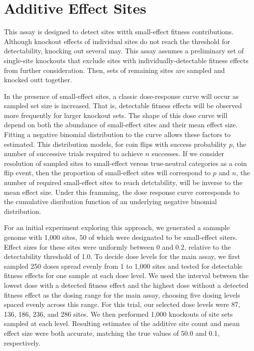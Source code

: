 \section{Additive Effect Sites}

This assay is designed to detect sites witth small-effect fitness contributions.
Although knockout effects of individual sites do not reach the threshold for detectability, knocking out several may.
This assay assumes a preliminary set of single-site knockouts that exclude sites with individually-detectable fitness effects from further consideration.
Then, sets of remaining sites are sampled and knocked outt together.

In the presence of small-effect sites, a classic dose-response curve will occur as sampled set size is increased.
That is, detectable fitness effects will be observed more frequently for larger knockout sets.
The shape of this dose curve will depend on both the abundance of small-effect sites and their mean effect size.
Fitting a negative binomial distribution to the curve allows these factors to estimated.
This distribution models, for coin flips with success probability $p$, the number of successive trials required to achieve $n$ successes.
If we consider resolution of sampled sites to small-effect versus true-neutral categories as a coin flip event, then the proportion of small-effect sites will correspond to $p$ and $n$, the number of required small-effect sites to reach detctability, will be inverse to the mean effect size.
Under this framming, the dose response curve corresponds to the cumulative disribution function of an underlying negative binomial distribution.

For an initial experiment exploring this approach, we generated a sammple genome with 1,000 sites, 50 of which were designated to be small-effect siters.
Effect sizes for these sites were uniformly between 0 and 0.2, relative to the detectability threshold of 1.0.
To decide dose levels for the main assay, we first sampled 250 doses spread evenly from 1 to 1,000 sites and tested for detectable fitness effects for one sample at each dose level.
We used the interval between the lowest dose with a detected fitness effect and the highest dose without a detected fitness effect as the dosing range for the main assay, choosing five dosing levels spaced evenly across this range.
For this trial, our selected dose levels were 87, 136, 186, 236, and 286 sites.
We then performed 1,000 knockouts of site sets sampled at each level.
Resulting estimates of the additive site count and mean effect size were both accurate, matching the true values of 50.0 and 0.1, respectively.

